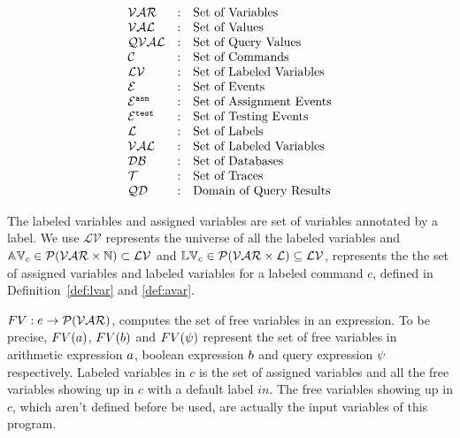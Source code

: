 \[
\begin{array}{lll}
\mathcal{VAR} & : & \mbox{Set of Variables}  
\\ 
%
\mathcal{VAL} & : & \mbox{Set of Values} 
\\ 
%
\mathcal{QVAL} & : & \mbox{Set of Query Values} 
\\ 
%
\cdom & : & \mbox{Set of Commands} 
\\ 
%
\mathcal{LV} & : & \mbox{Set of Labeled Variables}
\\
%
\eventset  & : & \mbox{Set of Events}  
\\
%
\eventset^{\asn}  & : & \mbox{Set of Assignment Events}  
\\
%
\eventset^{\test}  & : & \mbox{Set of Testing Events}  
\\
%
\ldom  & : & \mbox{Set of Labels}  
\\
\mathcal{VAL}  & : & \mbox{Set of Labeled Variables}  
\\
\dbdom  & : & \mbox{{Set of Databases}} 
\\
%
{\mathcal{T}} & : & \mbox{Set of Traces}
\\
%
\qdom & : & \mbox{{Domain of Query Results}}\\
\end{array}
\]

The labeled variables and assigned variables are set of variables annotated by a label. 
We use  
$\mathcal{LV}$ represents the universe of all the labeled variables and 
$\mathbb{AV}_c \in \mathcal{P}(\mathcal{VAR} \times \mathbb{N}) \subset \mathcal{LV}$ and 
$\mathbb{LV}_c \in \mathcal{P}(\mathcal{VAR} \times \mathcal{L}) \subseteq \mathcal{LV}$,
represents the the set of assigned variables and labeled variables for a labeled command $c$,
defined in Definition~\ref{def:lvar} and \ref{def:avar}.
%

$FV: e \to \mathcal{P}(\mathcal{VAR})$, computes the set of free variables in an expression. To be precise,
$FV(a)$, $FV(b)$ and $FV(\psi)$ represent the set of free variables in arithmetic
expression $a$, boolean expression $b$ and query expression $\psi$ respectively.
Labeled variables in $c$ is the set of assigned variables and all the free variables
showing up in $c$ with a default label $in$. 
The free variables
showing up in $c$, which aren't defined before be used, are actually the input variables of this program.
%

